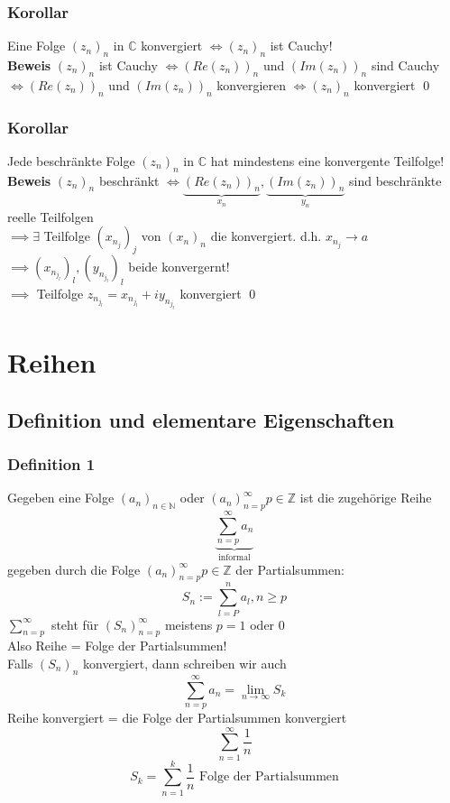 \documentclass[fleqn]{scrbook}
\renewenvironment{proof}{{\bfseries Beweis }}{\qed}
\begin{document}
\subsection{Korollar}
Eine Folge $(z_n)_n$ in $\mathbb{C}$ konvergiert $\Leftrightarrow (z_n)_n$ ist Cauchy!\\
\begin{proof}
$(z_n)_n$ ist Cauchy $\Leftrightarrow (Re(z_n))_n$ und $(Im(z_n))_n$ sind Cauchy $\Leftrightarrow (Re(z_n))_n$ und $(Im(z_n))_n$ konvergieren $\Leftrightarrow (z_n)_n$ konvergiert
\end{proof}
\subsection{Korollar} Jede beschränkte Folge $(z_n)_n$ in $\mathbb{C}$ hat mindestens eine konvergente Teilfolge!\\
\begin{proof}
$(z_n)_n$ beschränkt $\Leftrightarrow \underbrace{(Re(z_n))_n}_{x_n}, \underbrace{(Im(z_n))_n}_{y_n}$ sind beschränkte reelle Teilfolgen\\
$\implies \exists$ Teilfolge $(x_{n_j})_j$ von $(x_n)_n$ die konvergiert. d.h. $x_{n_j} \rightarrow a$\\
$\implies (x_{n_{j_l}})_l, (y_{n_{j_l}})_l$ beide konvergernt!\\
$\implies$ Teilfolge $z_{n_{j_l}} = x_{n_{j_l}} + iy_{n_{j_l}}$ konvergiert
\end{proof}


\chapter{Reihen}
  \section{Definition und elementare Eigenschaften}
    \subsection{Definition 1} Gegeben eine Folge $(a_n)_{n\in\mathbb{N}}$ oder $(a_n)^\infty_{n=p} p\in\mathbb{Z}$ ist die zugehörige Reihe
      $$\underbrace{\sum^\infty_{n=p} a_n}_{\text{informal}}$$ 
gegeben durch die Folge $(a_n)^\infty_{n=p} p\in\mathbb{Z}$ der Partialsummen: $$ S_n := \sum^n_{l=P} a_l, n\geq p$$
$\sum^\infty_{n=p}$ steht für  $(S_n)^\infty_{n=p}$ meistens $p=1$ oder 0\\
Also Reihe = Folge der Partialsummen!\\
Falls $(S_n)_n$ konvergiert, dann schreiben wir auch $$\sum^\infty_{n=p} a_n = \lim_{n\rightarrow\infty} S_k$$
Reihe konvergiert = die Folge der Partialsummen konvergiert
$$\sum^\infty_{n=1} \frac{1}{n}$$ $$S_k = \sum^k_{n=1} \frac{1}{n} \text{ Folge der Partialsummen}$$
\end{document}
